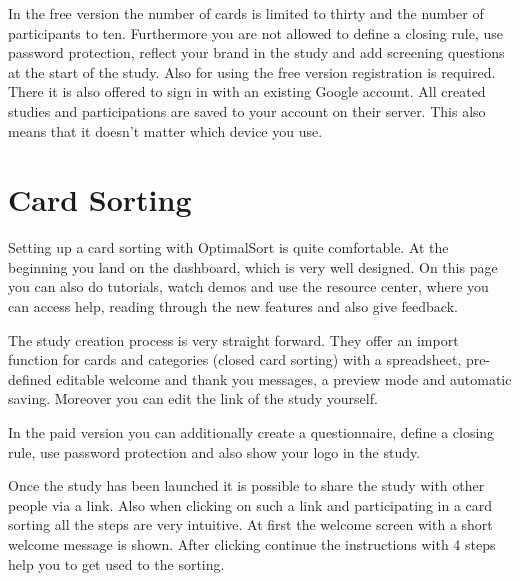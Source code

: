 In the free version the number of cards is limited to thirty and the
number of participants to ten.  Furthermore you are not allowed to
define a closing rule, use password protection, reflect your brand in
the study and add screening questions at the start of the study.  Also
for using the free version registration is required. There it is also
offered to sign in with an existing Google account. All created
studies and participations are saved to your account on their
server. This also means that it doesn't matter which device you use.



\section{Card Sorting}

Setting up a card sorting with OptimalSort is quite comfortable. At the beginning you land on the 
dashboard, which is very well designed. On this page you can also do tutorials, watch demos and 
use the resource center, where you can access help, reading through the new features and also
give feedback.

The study creation process is very straight forward. They offer an import function for cards and
categories (closed card sorting) with a spreadsheet, pre-defined editable welcome and thank you
messages, a preview mode and automatic saving. Moreover you can edit the link of the study
yourself. 

In the paid version you can additionally create a questionnaire, define a closing rule, use
password protection and also show your logo in the study.

Once the study has been launched it is possible to share the study with other people via a link. 
Also when clicking on such a link and participating in a card sorting all the steps are 
very intuitive. At first the welcome screen with a short welcome message is shown. After clicking 
continue the instructions with 4 steps help you to get used to the sorting. 

